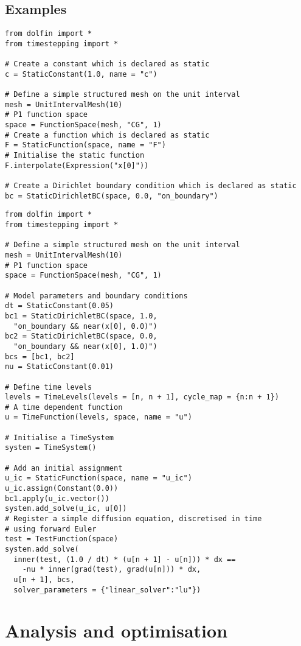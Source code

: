 \documentclass[a4paper]{book}
\begin{document}
\subsection*{Examples}

\begin{lstlisting}
from dolfin import *
from timestepping import *

# Create a constant which is declared as static
c = StaticConstant(1.0, name = "c")

# Define a simple structured mesh on the unit interval
mesh = UnitIntervalMesh(10)
# P1 function space
space = FunctionSpace(mesh, "CG", 1)
# Create a function which is declared as static
F = StaticFunction(space, name = "F")
# Initialise the static function
F.interpolate(Expression("x[0]"))

# Create a Dirichlet boundary condition which is declared as static
bc = StaticDirichletBC(space, 0.0, "on_boundary")
\end{lstlisting}

\begin{lstlisting}
from dolfin import *
from timestepping import *

# Define a simple structured mesh on the unit interval
mesh = UnitIntervalMesh(10)
# P1 function space
space = FunctionSpace(mesh, "CG", 1)

# Model parameters and boundary conditions
dt = StaticConstant(0.05)
bc1 = StaticDirichletBC(space, 1.0,
  "on_boundary && near(x[0], 0.0)")
bc2 = StaticDirichletBC(space, 0.0,
  "on_boundary && near(x[0], 1.0)")
bcs = [bc1, bc2]
nu = StaticConstant(0.01)

# Define time levels
levels = TimeLevels(levels = [n, n + 1], cycle_map = {n:n + 1})
# A time dependent function
u = TimeFunction(levels, space, name = "u")

# Initialise a TimeSystem
system = TimeSystem()

# Add an initial assignment
u_ic = StaticFunction(space, name = "u_ic")
u_ic.assign(Constant(0.0))
bc1.apply(u_ic.vector())
system.add_solve(u_ic, u[0])
# Register a simple diffusion equation, discretised in time
# using forward Euler
test = TestFunction(space)
system.add_solve(
  inner(test, (1.0 / dt) * (u[n + 1] - u[n])) * dx ==
    -nu * inner(grad(test), grad(u[n])) * dx,
  u[n + 1], bcs,
  solver_parameters = {"linear_solver":"lu"})
\end{lstlisting}

\section{Analysis and optimisation}\label{sect:assembly}
\end{document}
